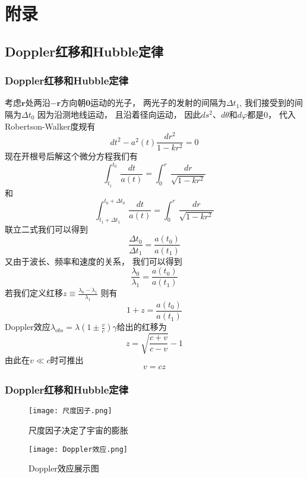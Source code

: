 \documentclass[8pt]{beamer}
\begin{document}
\section{附录}
    \subsection{Doppler红移和Hubble定律}
        \begin{frame}[fragile]
            \frametitle{Doppler红移和Hubble定律}

            \begin{multicols}{2} 
                \hypertarget{附录1}{}  
                \qquad   
                考虑$\textbf{r}$处两沿$-\textbf{r}$方向朝$\textbf{0}$运动的光子，
                两光子的发射的间隔为$\Delta t_1 $,
                我们接受到的间隔为$\Delta t_0 $
                因为沿测地线运动，
                且沿着径向运动，
                因此$ds^2$、$d\theta$和$d\varphi$都是0，
                代入Robertson-Walker度规有$$dt^2-a^2(t)\frac{dr^2}{1-kr^2}=0$$
                现在开根号后解这个微分方程我们有
                $$\int_{t_1}^{t_0}\,\frac{dt}{a(t)}=\int_{0}^{r}\,\frac{dr}{\sqrt{1-kr^2}}$$
                和
                $$\int_{t_1+\Delta t_1}^{t_0+\Delta t_0}\,\frac{dt}{a(t)}=\int_{0}^{r}\,\frac{dr}{\sqrt{1-kr^2}}$$
                联立二式我们可以得到$$\frac{\Delta t_0}{\Delta t_1}=\frac{a(t_0)}{a(t_1)}$$
                又由于波长、频率和速度的关系，
                我们可以得到$$\frac{\lambda_0}{\lambda_1}=\frac{a(t_0)}{a(t_1)}$$
                若我们定义红移$z\equiv\frac{\lambda_0-\lambda_1}{\lambda_1} $
                则有$$1+z=\frac{a(t_0)}{a(t_1)}$$
                Doppler效应$\lambda_{obs}=\lambda(1\pm \frac{v}{c})\gamma $给出的红移为$$z=\sqrt{\frac{c+v}{c-v}}-1$$
                由此在$v\ll c$时可推出$$v=cz$$

            \end{multicols}

        \end{frame}

        \begin{frame}[fragile]
            \frametitle{Doppler红移和Hubble定律}
            \begin{multicols}{2}
                \begin{figure}[h]
                    \centering  
                    \texttt{[image: 尺度因子.png]}  
                    \caption{尺度因子决定了宇宙的膨胀} 
                \end{figure}
                \begin{figure}[h]
                    \centering  
                    \texttt{[image: Doppler效应.png]}  
                    \caption{Doppler效应展示图} 
                \end{figure}
            \end{multicols}
        \end{frame}
\end{document}
